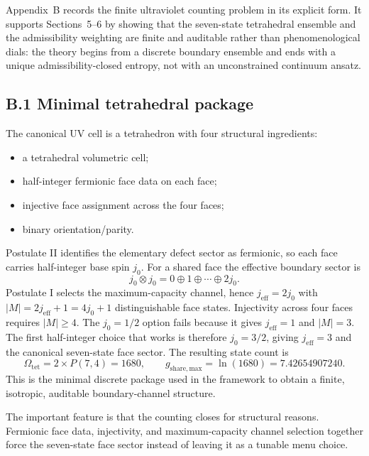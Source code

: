 \documentclass[11pt]{article}
\begin{document}
Appendix~B records the finite ultraviolet counting problem in its explicit form. It supports Sections~5--6 by showing that the seven-state tetrahedral ensemble and the admissibility weighting are finite and auditable rather than phenomenological dials: the theory begins from a discrete boundary ensemble and ends with a unique admissibility-closed entropy, not with an unconstrained continuum ansatz.

\subsection*{B.1 Minimal tetrahedral package}

The canonical UV cell is a tetrahedron with four structural ingredients:
\begin{itemize}
\item a tetrahedral volumetric cell;
\item half-integer fermionic face data on each face;
\item injective face assignment across the four faces;
\item binary orientation/parity.
\end{itemize}
Postulate II identifies the elementary defect sector as fermionic, so each face carries half-integer base spin $j_0$. For a shared face the effective boundary sector is
\[
j_0\otimes j_0 = 0\oplus 1\oplus \cdots \oplus 2j_0.
\]
Postulate I selects the maximum-capacity channel, hence $j_{\mathrm{eff}}=2j_0$ with $|M|=2j_{\mathrm{eff}}+1=4j_0+1$ distinguishable face states. Injectivity across four faces requires $|M|\ge 4$. The $j_0=1/2$ option fails because it gives $j_{\mathrm{eff}}=1$ and $|M|=3$. The first half-integer choice that works is therefore $j_0=3/2$, giving $j_{\mathrm{eff}}=3$ and the canonical seven-state face sector.
The resulting state count is
\[
\Omega_{\mathrm{tet}}=2\times P(7,4)=1680,
\qquad
g_{\mathrm{share,max}}=\ln(1680)=7.42654907240.
\]
This is the minimal discrete package used in the framework to obtain a finite, isotropic, auditable boundary-channel structure.

The important feature is that the counting closes for structural reasons. Fermionic face data, injectivity, and maximum-capacity channel selection together force the seven-state face sector instead of leaving it as a tunable menu choice.
\end{document}
